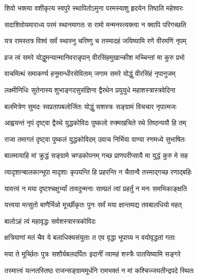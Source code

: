 
\twolineshloka
{शिवो भक्त्या वशीकृत्य स्वपुरे स्थापितोऽमुना}
{परमस्याशु हृदयेन तिष्ठति महेश्वरः}%

\twolineshloka
{सदाशिवोयमाराध्य परमं स्थानमागतः}
{स रामो मन्मनस्त्यक्त्वा न क्वापि परिगच्छति}%

\twolineshloka
{यत्र रामस्तत्र विश्वं सर्वं स्थास्नु चरिष्णु च}
{तस्मादहं जयिष्यामि रणे वीरमणिं नृपम्}%

\twolineshloka
{व्रज त्वं समरे योद्धुमन्यान्मानिवरान्नृपान्}
{वीरसिंहमुखान्कीश मच्चिन्तां मा कुरु प्रभो}%

\twolineshloka
{वाचमित्थं समाकर्ण्य हनूमान्धीरसेविताम्}
{जगाम समरे योद्धुं वीरसिंहं नृपानुजम्}%

\twolineshloka
{लक्ष्मीनिधिः सुतेनास्य शुभाङ्गदसुसंज्ञिना}
{द्वैरथेन प्रयुयुधे महाशस्त्रास्त्रवेदिना}%

\twolineshloka
{बलमित्रेण सुमदः स्वप्रतापबलोर्जितः}
{योद्धुं सशस्त्रः सङ्ग्रामं विचचार नृपात्मजः}%

\twolineshloka
{आह्वयन्तं नृपं दृष्ट्वा द्वैरथे युद्धकोविदः}
{पुष्कलो रुक्मखचिते रथे तिष्ठन्ययौ हि तम्}%

\twolineshloka
{राजा तमागतं दृष्ट्वा पुष्कलं युद्धकोविदम्}
{उवाच निर्भिया वाण्या रणमध्ये सुभाषितः}%


\twolineshloka
{बालमायाहि मां क्रुद्धं सङ्ग्रामे चण्डकोपनम्}
{गच्छ प्राणपरीप्सायै मा युद्धं कुरु मे सह}%

\twolineshloka
{त्वादृशान्बालकान्भूपा मादृशाः कृपयन्ति हि}
{प्रहरन्ति न चैतान्वै तस्माद्गच्छ रणाद्बहिः}%

\twolineshloka
{यावत्त्वं न मया दृष्टश्चक्षुर्भ्यां तावदुन्मनाः}
{साम्प्रतं त्वां प्रहर्तुं न मनः समभिकाङ्क्षति}%

\twolineshloka
{यत्त्वया मत्सुतो बाणैर्भिन्नो मूर्च्छीकृतः पुनः}
{सर्वं मया क्षान्तमद्य तवबालधियो महत्}%



\onelineshloka
{बालोऽहं त्वं महावृद्धः सर्वशस्त्रास्त्रकोविदः}%

\twolineshloka
{क्षत्रियाणां मतं चैव ये बलाधिक्यसंयुताः}
{त एव वृद्धा भूपाग्र्य न वयोवृद्धतां गताः}%

\twolineshloka
{मया ते मूर्च्छितः पुत्रः सशौर्यबलदर्पितः}
{इदानीं त्वामहं शस्त्रैः पातयिष्यामि सङ्गरे}%

\twolineshloka
{तस्मात्त्वं यत्नतस्तिष्ठ राजन्सङ्ग्राममूर्धनि}
{रामभक्तं न मां कश्चिज्जयतीन्द्रपदे स्थितः}%

